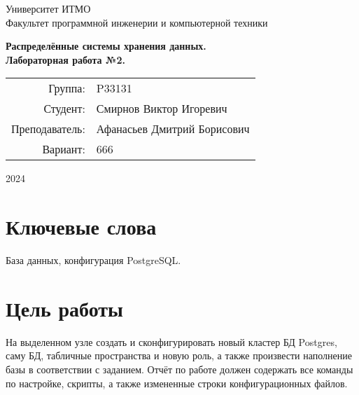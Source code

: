 \documentclass{article}
\begin{document}
\begin{titlepage}
    \begin{center}
        \begin{spacing}{1.4}
            \large{Университет ИТМО} \\
            \large{Факультет программной инженерии и компьютерной техники} \\
        \end{spacing}
        \vfill
        \textbf{
            \huge{Распределённые системы хранения данных.} \\
            \huge{Лабораторная работа №2.} \\
        }
    \end{center}
    \vfill
    \begin{center}
        \begin{tabular}{r l}
            Группа:        & P33131                      \\
            Студент:       & Смирнов Виктор Игоревич     \\
            Преподаватель: & Афанасьев Дмитрий Борисович \\
            Вариант:       & 666                         \\
        \end{tabular}
    \end{center}
    \vfill
    \begin{center}
        \begin{large}
            2024
        \end{large}
    \end{center}
\end{titlepage}

\section*{Ключевые слова}

База данных, конфигурация PostgreSQL.

\tableofcontents

\section{Цель работы}

На выделенном узле создать и сконфигурировать новый кластер БД Postgres, саму БД, табличные пространства и новую роль, а также произвести наполнение базы в соответствии с заданием. Отчёт по работе должен содержать все команды по настройке, скрипты, а также измененные строки конфигурационных файлов.
\end{document}
